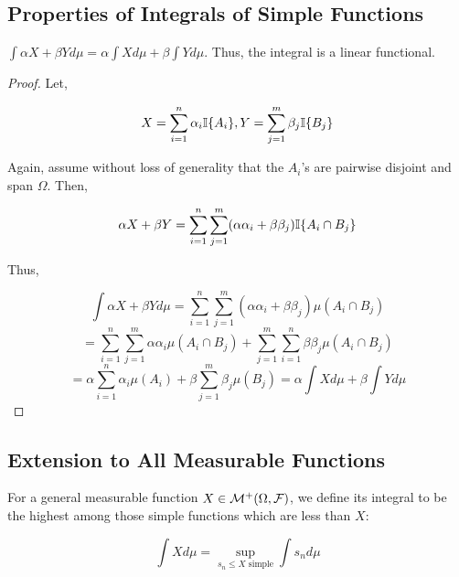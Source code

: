 \subsection{Properties of Integrals of Simple Functions}

\begin{Proposition} 
    $\int \alpha X + \beta Y d\mu = \alpha \int X d\mu + \beta \int Y d\mu$. Thus, the 
    integral is a linear functional.
\end{Proposition}

\begin{proof}
    Let, 

    \[ X = \sum_{i=1}^n \alpha_i \mathbb I\{A_i\}, Y = \sum_{j=1}^m \beta_j \mathbb I\{B_j\} \]

    Again, assume without loss of generality that the $A_i$'s are pairwise disjoint and 
    span $\Omega$. Then, 

    \[ \alpha X + \beta Y = \sum_{i=1}^n\sum_{j=1}^m (\alpha \alpha_i + \beta \beta_j)\mathbb I\{A_i \cap B_j\} \]

    Thus,

    \[ \int \alpha X + \beta Y d\mu  = \sum_{i=1}^n \sum_{j=1}^m (\alpha \alpha_i + \beta \beta_j)\mu(A_i \cap B_j)\]
    \[ =  \sum_{i=1}^n \sum_{j=1}^m\alpha \alpha_i \mu(A_i \cap B_j) + \sum_{j=1}^m \sum_{i=1}^n \beta\beta_j \mu(A_i \cap B_j)  \]
    \[ = \alpha \sum_{i=1}^n \alpha_i \mu(A_i) + \beta \sum_{j=1}^m \beta_j \mu(B_j) = \alpha \int X d\mu + \beta \int Y d\mu \] 
\end{proof}

    \subsection{Extension to All Measurable Functions}

    For a general measurable function $X \in \mathcal M^+(\Omega, \mathcal F)$, we define its integral to be the highest among those 
    simple functions which are less than $X$:

    \[ \int X d\mu = \sup_{s_n \leq X \text{ simple}}  \int s_n d\mu \]

